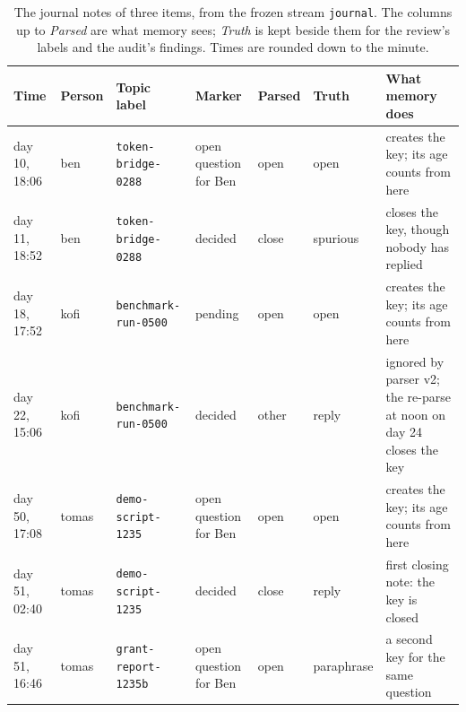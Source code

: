 \documentclass[11pt]{article}
\newcommand{\code}[1]{\texttt{#1}}
\theoremstyle{definition}
\theoremstyle{plain}
\begin{document}
\begin{table}[ht]
\centering\footnotesize\setlength{\tabcolsep}{4pt}
\begin{tabularx}{\textwidth}{>{\raggedright\arraybackslash}p{1.75cm}>{\raggedright\arraybackslash}p{0.95cm}>{\raggedright\arraybackslash}p{3.1cm}>{\raggedright\arraybackslash}p{1.85cm}>{\raggedright\arraybackslash}p{1.0cm}>{\raggedright\arraybackslash}p{1.55cm}>{\raggedright\arraybackslash}X}
\toprule
Time & Person & Topic label & Marker & Parsed & Truth & What memory does\\
\midrule
day 10, 18:06 & ben & \code{token-bridge-0288} & open question for Ben & open & open & creates the key; its age counts from here\\
day 11, 18:52 & ben & \code{token-bridge-0288} & decided & close & spurious & closes the key, though nobody has replied\\
day 18, 17:52 & kofi & \code{benchmark-run-0500} & pending & open & open & creates the key; its age counts from here\\
day 22, 15:06 & kofi & \code{benchmark-run-0500} & decided & other & reply & ignored by parser v2; the re-parse at noon on day 24 closes the key\\
day 50, 17:08 & tomas & \code{demo-script-1235} & open question for Ben & open & open & creates the key; its age counts from here\\
day 51, 02:40 & tomas & \code{demo-script-1235} & decided & close & reply & first closing note: the key is closed\\
day 51, 16:46 & tomas & \code{grant-report-1235b} & open question for Ben & open & paraphrase & a second key for the same question\\
\bottomrule
\end{tabularx}
\caption{The journal notes of three items, from the frozen stream \code{journal}. The columns up to \emph{Parsed} are what memory sees; \emph{Truth} is kept beside them for the review's labels and the audit's findings. Times are rounded down to the minute.}\label{tab:journal}
\end{table}
\end{document}
